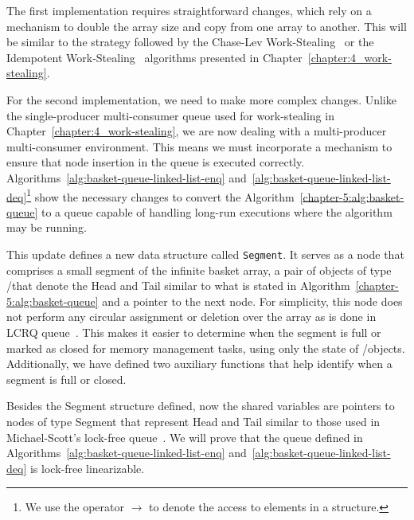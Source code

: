 The first implementation requires straightforward changes, which rely on a mechanism to double the array size and copy from one array to another. This will be similar to the strategy followed by the Chase-Lev Work-Stealing~\cite{circular.work.stealing} or the Idempotent Work-Stealing~\cite{maged.vechev.2009} algorithms presented in Chapter~\ref{chapter:4_work-stealing}.

For the second implementation, we need to make more complex changes. Unlike the single-producer multi-consumer queue used for work-stealing in Chapter~\ref{chapter:4_work-stealing}, we are now dealing with a multi-producer multi-consumer environment. This means we must incorporate a mechanism to ensure that node insertion in the queue is executed correctly.  Algorithms~\ref{alg:basket-queue-linked-list-enq} and~\ref{alg:basket-queue-linked-list-deq}\footnote{We use the operator \(\rightarrow\) to denote the access to elements in a structure.} show the necessary changes to convert the Algorithm~\ref{chapter-5:alg:basket-queue} to a queue capable of handling long-run executions where the algorithm may be running.

This update defines a new data structure called \texttt{Segment}. It serves as a node that comprises a small segment of the infinite basket array, a pair of objects of type \LL/\IC that denote the Head and Tail similar to what is stated in Algorithm~\ref{chapter-5:alg:basket-queue} and a pointer to the next node. For simplicity, this node does not perform any circular assignment or deletion over the array as is done in LCRQ queue~\cite{ppopp2013x86queues}. This makes it easier to determine when the segment is full or marked as closed for memory management tasks, using only the state of \LL/\IC objects. Additionally, we have defined two auxiliary functions that help identify when a segment is full or closed.

Besides the Segment structure defined, now the shared variables are pointers to nodes of type Segment that represent Head and Tail similar to those used in Michael-Scott's lock-free queue~\cite{DBLP_conf_podc_MichaelS96}. We will prove that the queue defined in Algorithms~\ref{alg:basket-queue-linked-list-enq} and~\ref{alg:basket-queue-linked-list-deq} is lock-free linearizable.

